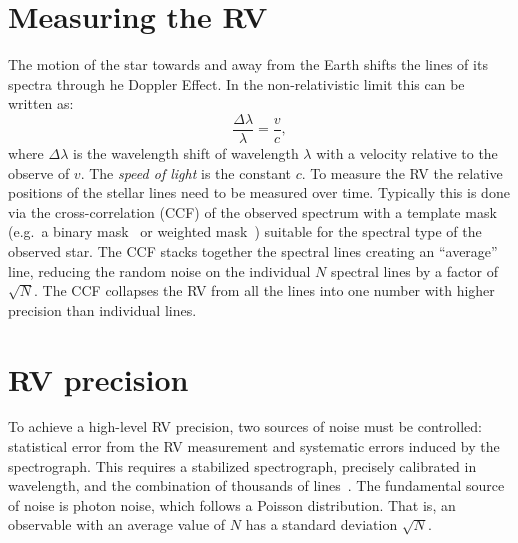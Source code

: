 
\section{Measuring the {RV}}
The motion of the star towards and away from the Earth shifts the lines of its spectra through he Doppler Effect.
In the non-relativistic limit this can be written as:
\begin{equation}
\frac{\Delta\lambda}{\lambda} = \frac{v}{c},
\end{equation}
where $\Delta\lambda$ is the wavelength shift of wavelength $\lambda$ with a velocity relative to the observe of \(v\).
The \emph{speed of light} is the constant $c$.
To measure the {RV} the relative positions of the stellar lines need to be measured over time.
Typically this is done via the cross-correlation ({CCF}) of the observed spectrum with a template mask (e.g.\ a binary mask~\citep{baranne_elodie_1996} or weighted mask~\citep{pepe_coralie_2002}) suitable for the spectral type of the observed star.
The {CCF} stacks together the spectral lines creating an ``average'' line, reducing the random noise on the individual $N$ spectral lines by a factor of $\sqrt{N}$.
The {CCF} collapses the {RV} from all the lines into one number with higher precision than individual lines.


\section{{RV} precision}
\label{section:rv_precision}
To achieve a high-level {RV} precision, two sources of noise must be controlled: statistical error from the {RV} measurement and systematic errors induced by the spectrograph.
This requires a stabilized spectrograph, precisely calibrated in wavelength, and the combination of thousands of lines~\citep[e.g.][]{pepe_instrumentation_2014}.
The fundamental source of noise is photon noise, which follows a {Poisson} distribution.
That is, an observable with an average value of $N$ has a standard deviation $\sqrt{N}$.

